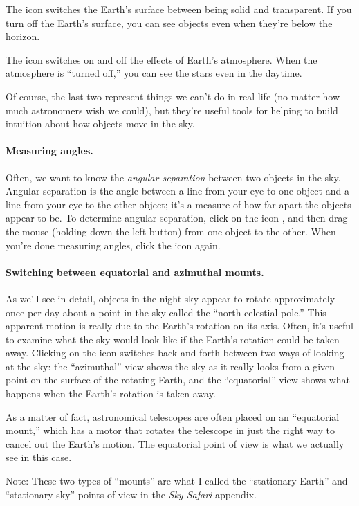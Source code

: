 The  icon switches the Earth's surface between being
solid and transparent. If you turn off the Earth's surface, you can
see objects even when they're below the horizon. 

The  icon switches on and off the effects of 
Earth's atmosphere. When the atmosphere is ``turned off,'' you
can see the stars even in the daytime.

Of course, the last two represent things we can't do in real life
(no matter how much astronomers wish we could), but they're
useful tools for helping to build intuition about how
objects move in the sky.

\paragraph{Measuring angles.}
Often, we want to know the \textit{angular separation} between two
objects in the sky. Angular separation is the angle between a line from your eye
to one object and a line from your eye to the other object; it's a measure
of how far apart the objects appear to be. To determine
angular separation, click on the icon , and then drag
the mouse (holding down the left button) from one object to the other.
When you're done measuring angles, click the  icon again.

\paragraph{Switching between equatorial and azimuthal mounts.}
As we'll see in detail, objects in the night sky appear to rotate
approximately once per day about a point in the sky called the ``north
celestial pole.'' This apparent motion is really due to the 
Earth's rotation on its axis. 
Often, it's useful to examine what the sky would look like if
the Earth's rotation could be taken away. Clicking on the 
 icon switches back and forth between two ways of looking
at the sky: the ``azimuthal'' view shows  the sky as it really looks from 
a given point on the surface of the rotating Earth, and the ``equatorial''
view shows
what happens when the Earth's rotation is taken away.

As a matter of fact, astronomical telescopes are often
placed on an ``equatorial mount,'' which has a motor that 
rotates the telescope
in just the right way to cancel out the Earth's motion. The 
equatorial point of view is what we actually see in this case.  

Note: These two types of ``mounts'' are what I called the
``stationary-Earth'' and ``stationary-sky'' points of view
in the \textit{Sky Safari} appendix. 

